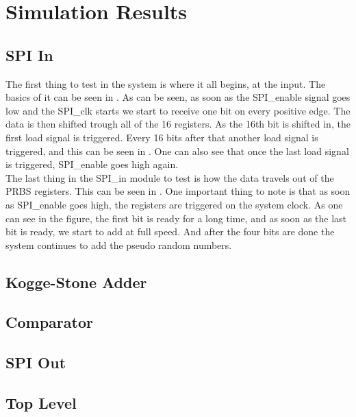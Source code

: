 \section{Simulation Results} \label{sec:simulation_results}

\subsection{SPI In}
The first thing to test in the system is where it all begins, at the input. The basics of it can be seen in . As can be seen, as soon as the SPI\_enable signal goes low and the SPI\_clk starts we start to receive one bit on every positive edge. The data is then shifted trough all of the 16 registers. As the 16th bit is shifted in, the first load signal is triggered. Every 16 bits after that another load signal is triggered, and this can be seen in . One can also see that once the last load signal is triggered, SPI\_enable goes high again.\\
The last thing in the SPI\_in module to test is how the data travels out of the PRBS registers. This can be seen in . One important thing to note is that as soon as SPI\_enable goes high, the registers are triggered on the system clock. As one can see in the figure, the first bit is ready for a long time, and as soon as the last bit is ready, we start to add at full speed. And after the four bits are done the system continues to add the pseudo random numbers. 
\subsection{Kogge-Stone Adder}

\subsection{Comparator}

\subsection{SPI Out}

\subsection{Top Level}
